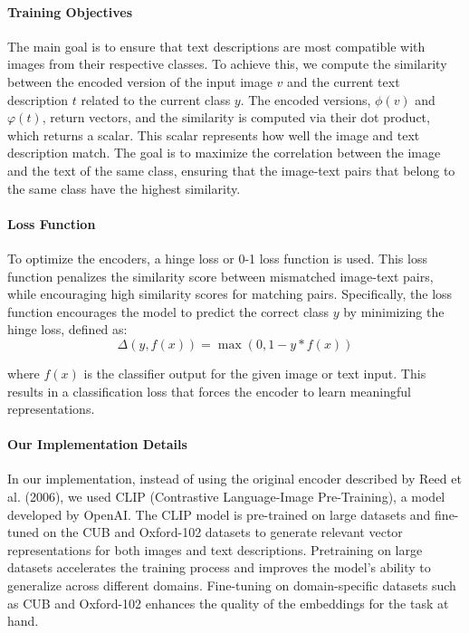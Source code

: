 \paragraph{Training Objectives}
The main goal is to ensure that text descriptions are most compatible with images from
their respective classes. To achieve this, we compute the similarity between the 
encoded version of the input image $v$ and the current text description $t$ 
related to the current class $y$. The encoded versions, $\phi(v)$ and $\varphi(t)$, return vectors, 
and the similarity is computed via their dot product, which returns a scalar. 
This scalar represents how well the image and text description match. The goal is 
to maximize the correlation between the image and the text of the same class, 
ensuring that the image-text pairs that belong to the same class have the highest similarity.

\paragraph{Loss Function}
To optimize the encoders, a hinge loss or 0-1 loss function is used. 
This loss function penalizes the similarity score between mismatched image-text pairs, 
while encouraging high similarity scores for matching pairs. Specifically, 
the loss function encourages the model to predict the correct class $y$ by minimizing the hinge loss, defined as:
\[
\Delta( y, f(x) ) = \max (0 , 1 - y * f(x) )
\]

where $f(x)$ is the classifier output for the given image or text input. 
This results in a classification loss that forces the encoder to learn meaningful representations.

\paragraph{Our Implementation Details}
In our implementation, instead of using the original encoder described by Reed et al. (2006), 
we used CLIP (Contrastive Language-Image Pre-Training), a model developed by OpenAI. 
The CLIP model is pre-trained on large datasets and fine-tuned on the CUB and Oxford-102 
datasets to generate relevant vector representations for both images and text descriptions. 
Pretraining on large datasets accelerates the training process and improves the model's 
ability to generalize across different domains. Fine-tuning on domain-specific datasets such 
as CUB and Oxford-102 enhances the quality of the embeddings for the task at hand.


